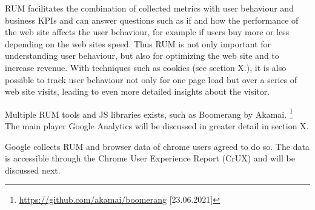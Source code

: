 RUM facilitates the combination of collected metrics with user behaviour and business KPIs and can answer questions such as if and how the performance of the web site affects the user behaviour, for example if users buy more or less depending on the web sites speed.%
Thus RUM is not only important for understanding user behaviour, but also for optimizing the web site and to increase revenue.
With techniques such as cookies (see section X.), it is also possible to track user behaviour not only for one page load but over a series of web site visits, leading to even more detailed insights about the visitor. %



Multiple RUM tools and JS libraries exists, such as Boomerang by Akamai. \footnote{\url{https://github.com/akamai/boomerang} [23.06.2021]}
The main player Google Analytics will be discussed in greater detail in section X.




Google collects RUM and browser data of chrome users agreed to do so.
The data is accessible through the Chrome User Experience Report (CrUX) and will be discussed next.









